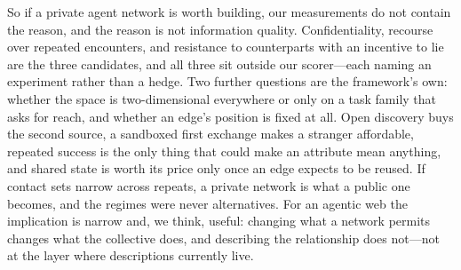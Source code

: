 So if a private agent network is worth building, our measurements do not contain the reason,
and the reason is not information quality. Confidentiality, recourse over repeated
encounters, and resistance to counterparts with an incentive to lie are the three
candidates, and all three sit outside our scorer---each naming an experiment rather than a
hedge. Two further questions are the framework's own: whether the space is two-dimensional
everywhere or only on a task family that asks for reach, and whether an edge's position is
fixed at all. Open discovery buys the second source, a sandboxed first exchange makes a
stranger affordable, repeated success is the only thing that could make an attribute mean
anything, and shared state is worth its price only once an edge expects to be reused. If
contact sets narrow across repeats, a private network is what a public one becomes, and the
regimes were never alternatives. For an agentic web the implication is narrow and, we think,
useful: changing what a network permits changes what the collective does, and describing the
relationship does not---not at the layer where descriptions currently live.

